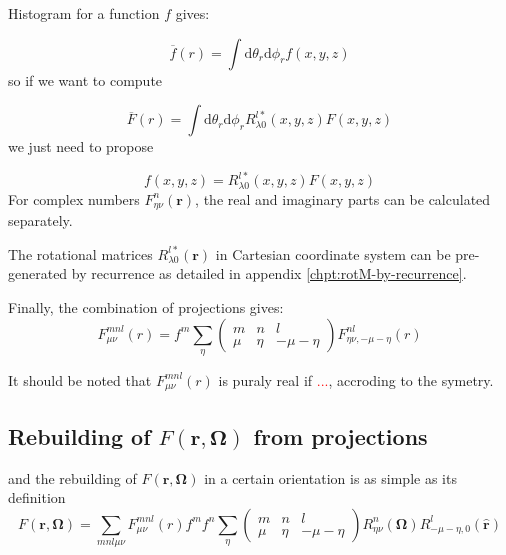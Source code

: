 Histogram for a function $f$ gives:

\begin{equation}
\overline{f}(r)=\int\mathrm{d}\theta_{r}\mathrm{d}\phi_{r}f(x,y,z)
\end{equation}
so if we want to compute

\begin{equation}
\overline{F}(r)=\int\mathrm{d}\theta_{r}\mathrm{d}\phi_{r}R_{\lambda0}^{l*}(x,y,z)F(x,y,z)
\end{equation}
we just need to propose 

\begin{equation}
f(x,y,z)=R_{\lambda0}^{l*}(x,y,z)F(x,y,z)
\end{equation}
For complex numbers $F_{\eta\nu}^{n}(\mathbf{r})$, the real and imaginary
parts can be calculated separately.

The rotational matrices $R_{\lambda0}^{l*}(\mathbf{r})$ in Cartesian
coordinate system can be pre-generated by recurrence as detailed in
appendix \ref{chpt:rotM-by-recurrence}. 

Finally, the combination of projections gives:
\begin{equation}
F_{\mu\nu}^{mnl}(r)=f^{m}\sum_{\eta}\left(\begin{array}{ccc}
m & n & l\\
\mu & \eta & -\mu-\eta
\end{array}\right)F_{\eta\nu,-\mu-\eta}^{nl}(r)
\end{equation}

It should be noted that $F_{\mu\nu}^{mnl}(r)$ is puraly real if \textcolor{red}{...},
accroding to the symetry.

\subsection*{Rebuilding of $F(\mathbf{r},\mathbf{\Omega})$ from projections}

and the rebuilding of $F(\mathbf{r},\mathbf{\Omega})$ in a certain
orientation is as simple as its definition
\begin{equation}
F(\mathbf{r},\mathbf{\Omega})=\sum_{mnl\mu\nu}F_{\mu\nu}^{mnl}(r)f^{m}f^{n}\sum_{\eta}\left(\begin{array}{ccc}
m & n & l\\
\mu & \eta & -\mu-\eta
\end{array}\right)R_{\eta\nu}^{n}(\mathbf{\Omega})R_{-\mu-\eta,0}^{l}(\mathbf{\hat{r}})\label{eq:bwd-1}
\end{equation}


